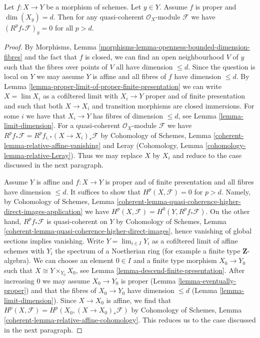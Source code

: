 \begin{lemma}
\label{lemma-higher-direct-images-zero-above-dimension-fibre}
Let $f : X \to Y$ be a morphism of schemes. Let $y \in Y$.
Assume $f$ is proper and $\dim(X_y) = d$.
Then for any quasi-coherent $\mathcal{O}_X$-module $\mathcal{F}$
we have $(R^pf_*\mathcal{F})_y = 0$ for all $p > d$.
\end{lemma}

\begin{proof}
By Morphisms, Lemma
\ref{morphisms-lemma-openness-bounded-dimension-fibres}
and the fact that $f$ is closed, we can find an open neighbourhood
$V$ of $y$ such that the fibres over points of $V$ all have dimension $\leq d$.
Since the question is local on $Y$ we may assume $Y$ is affine
and all fibres of $f$ have dimension $\leq d$.
By Lemma \ref{lemma-proper-limit-of-proper-finite-presentation}
we can write $X = \lim X_i$ as a cofiltered limit with $X_i \to Y$ proper and
of finite presentation and such that both $X \to X_i$
and transition morphisms are closed immersions.
For some $i$ we have that $X_i \to Y$ has fibres of dimension $\leq d$,
see Lemma \ref{lemma-limit-dimension}.
For a quasi-coherent $\mathcal{O}_X$-module $\mathcal{F}$ we have
$R^pf_*\mathcal{F} = R^pf_{i, *}(X \to X_i)_*\mathcal{F}$ by
Cohomology of Schemes, Lemma \ref{coherent-lemma-relative-affine-vanishing}
and Leray (Cohomology, Lemma \ref{cohomology-lemma-relative-Leray}).
Thus we may replace $X$ by $X_i$ and
reduce to the case discussed in the next paragraph.

\medskip\noindent
Assume $Y$ is affine and $f : X \to Y$ is proper and of finite presentation
and all fibres have dimension $\leq d$. It suffices to show that
$H^p(X, \mathcal{F}) = 0$ for $p > d$. Namely, by
Cohomology of Schemes, Lemma
\ref{coherent-lemma-quasi-coherence-higher-direct-images-application}
we have $H^p(X, \mathcal{F}) = H^0(Y, R^pf_*\mathcal{F})$.
On the other hand, $R^pf_*\mathcal{F}$ is quasi-coherent on $Y$
by Cohomology of Schemes, Lemma
\ref{coherent-lemma-quasi-coherence-higher-direct-images},
hence vanishing of global sections implies vanishing.
Write $Y = \lim_{i \in I} Y_i$ as a cofiltered limit of affine schemes
with $Y_i$ the spectrum of a Noetherian ring
(for example a finite type $\mathbf{Z}$-algebra).
We can choose an element $0 \in I$ and a finite type morphism
$X_0 \to Y_0$ such that $X \cong Y \times_{Y_0} X_0$, see
Lemma \ref{lemma-descend-finite-presentation}.
After increasing $0$ we may assume $X_0 \to Y_0$ is proper
(Lemma \ref{lemma-eventually-proper})
and that the fibres of $X_0 \to Y_0$ have dimension $\leq d$
(Lemma \ref{lemma-limit-dimension}).
Since $X \to X_0$ is affine, we find that
$H^p(X, \mathcal{F}) = H^p(X_0, (X \to X_0)_*\mathcal{F})$ by
Cohomology of Schemes, Lemma \ref{coherent-lemma-relative-affine-cohomology}.
This reduces us to the case discussed in the next paragraph.


\end{proof}
